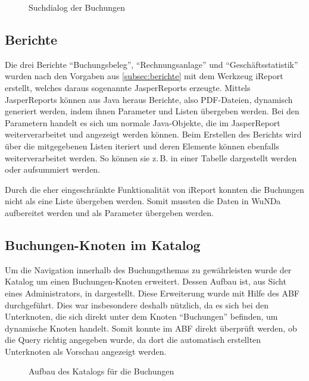 \begin{figure}[htbp]
	\centering
	\caption{Suchdialog der Buchungen}
	\label{fig:gui-suchdialog}
\end{figure}

\subsection{Berichte}
Die drei Berichte \enquote{Buchungsbeleg}, \enquote{Rechnungsanlage} und \enquote{Geschäftsstatistik} wurden nach den Vorgaben aus \autoref{subsec:berichte} mit dem Werkzeug iReport erstellt, welches daraus sogenannte JasperReports erzeugte.
Mittels JasperReports können aus Java heraus Berichte, also PDF-Dateien, dynamisch generiert werden, indem ihnen Parameter und Listen übergeben werden.
Bei den Parametern handelt es sich um normale Java-Objekte, die im JasperReport weiterverarbeitet und angezeigt werden können.
Beim Erstellen des Berichts wird über die mitgegebenen Listen iteriert und deren Elemente können ebenfalls weiterverarbeitet werden.
So können sie z.\,B. in einer Tabelle dargestellt werden oder aufsummiert werden.

Durch die eher eingeschränkte Funktionalität von iReport konnten die Buchungen nicht als eine Liste übergeben werden.
Somit mussten die Daten in \ac{WuNDa} aufbereitet werden und als Parameter übergeben werden.

\subsection{Buchungen-Knoten im Katalog}
Um die Navigation innerhalb des Buchungsthemas zu gewährleisten wurde der Katalog um einen Buchungen-Knoten erweitert.
Dessen Aufbau ist, aus Sicht eines Administrators, in  dargestellt.
Diese Erweiterung wurde mit Hilfe des \ac{ABF} durchgeführt.
Dies war insbesondere deshalb nützlich, da es sich bei den Unterknoten, die sich direkt unter dem Knoten \enquote{Buchungen} befinden, um dynamische Knoten handelt.
Somit konnte im \ac{ABF} direkt überprüft werden, ob die Query richtig angegeben wurde, da dort die automatisch erstellten Unterknoten als Vorschau angezeigt werden.
\begin{figure}[htb]
	\centering
	\caption{Aufbau des Katalogs für die Buchungen}
	\label{fig:katalog}
\end{figure}


